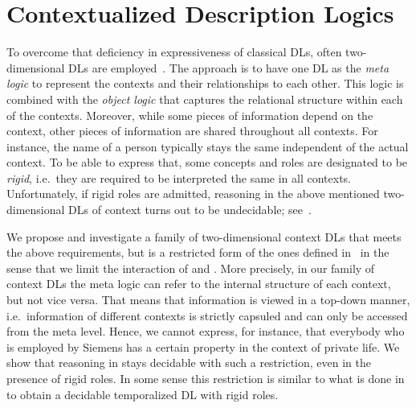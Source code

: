 \section{Contextualized Description Logics}
\label{sec:intro-contextualized-description-logics}

To overcome that deficiency in expressiveness of classical DLs, often
two-dimensional DLs are employed~\cite{KG-JELIA10,KLGu-DL-11,KlGu-AAAI11,KG16}. The approach is to
have one DL \LM as the \emph{meta logic} to represent the contexts and their relationships to each
other. This logic is combined with the \emph{object logic} \LO that captures the relational
structure within each of the contexts.
%
Moreover, while some pieces of information depend on the context, other pieces of information are
shared throughout all contexts.  For instance, the name of a person typically stays the same
independent of the actual context.  To be able to express that, some concepts and roles are designated
to be \emph{rigid}, i.e.~they are required to be interpreted the same in all contexts.
Unfortunately, if rigid roles are admitted, reasoning in the above mentioned two-dimensional DLs of
context turns out to be undecidable; see~\cite{KG-JELIA10}.

We propose and investigate a family of two-dimensional context DLs \LMLO that
meets the above requirements, but is a restricted form of the ones defined in~\cite{KG-JELIA10} in
the sense that we limit the interaction of \LM and \LO.  More precisely, in our family of
context DLs the meta logic can refer to the internal structure of each context, but not vice versa.
That means that information is viewed in a top-down manner, i.e.~information of different contexts
is strictly capsuled and can only be accessed from the meta level.  Hence, we cannot
express, for instance, that everybody who is employed by Siemens has a certain property in the
context of private life.  We show that reasoning in \LMLO stays decidable with
such a restriction, even in the presence of rigid roles.
%
In some sense this restriction is similar to what is done in~\cite{BaGL-KR08,BaGL-ToCL12,Lip-PhD14}
to obtain a decidable temporalized DL with rigid roles.  

